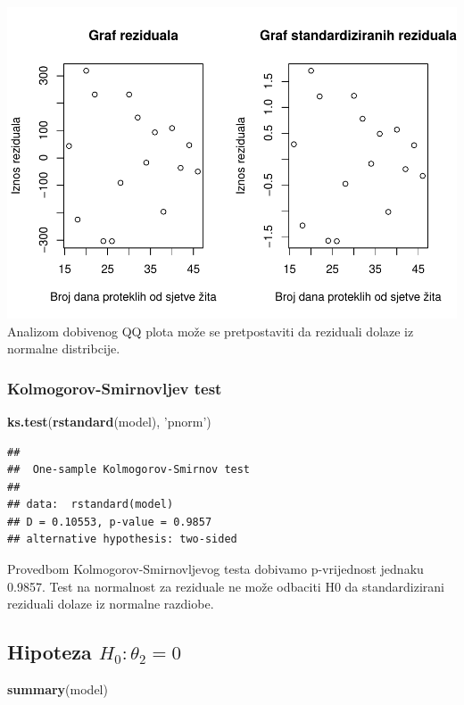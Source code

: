 \documentclass[]{article}
\newenvironment{Shaded}{\begin{snugshade}}{\end{snugshade}}
\newcommand{\KeywordTok}[1]{\textcolor[rgb]{0.13,0.29,0.53}{\textbf{{#1}}}}
\newcommand{\StringTok}[1]{\textcolor[rgb]{0.31,0.60,0.02}{{#1}}}
\newcommand{\NormalTok}[1]{{#1}}
\begin{document}
\includegraphics{Izvjestaj_files/figure-latex/unnamed-chunk-20-1.pdf}
Analizom dobivenog QQ plota može se pretpostaviti da reziduali dolaze iz
normalne distribcije.

\subsubsection{Kolmogorov-Smirnovljev
test}\label{kolmogorov-smirnovljev-test-2}

\begin{Shaded}
\begin{Highlighting}[]
\KeywordTok{ks.test}\NormalTok{(}\KeywordTok{rstandard}\NormalTok{(model), }\StringTok{'pnorm'}\NormalTok{)}
\end{Highlighting}
\end{Shaded}

\begin{verbatim}
## 
##  One-sample Kolmogorov-Smirnov test
## 
## data:  rstandard(model)
## D = 0.10553, p-value = 0.9857
## alternative hypothesis: two-sided
\end{verbatim}

Provedbom Kolmogorov-Smirnovljevog testa dobivamo p-vrijednost jednaku
0.9857. Test na normalnost za reziduale ne može odbaciti H0 da
standardizirani reziduali dolaze iz normalne razdiobe.

\subsection{\texorpdfstring{Hipoteza
\(H_0 : \theta_2 = 0\)}{Hipoteza H_0 : \textbackslash{}theta_2 = 0}}\label{hipoteza-h_0-theta_2-0}

\begin{Shaded}
\begin{Highlighting}[]
\KeywordTok{summary}\NormalTok{(model)}
\end{Highlighting}
\end{Shaded}
\end{document}
